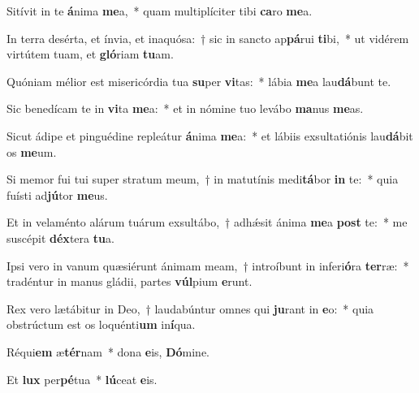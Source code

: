 \item Sitívit in te \textbf{á}nima \textbf{me}a,~* quam multiplíciter tibi \textbf{ca}ro \textbf{me}a.

\item In terra desérta, et ínvia, et inaquósa:~† sic in sancto ap\textbf{pá}rui \textbf{ti}bi,~* ut vidérem virtútem tuam, et \textbf{gló}riam \textbf{tu}am.

\item Quóniam mélior est misericórdia tua \textbf{su}per \textbf{vi}tas:~* lábia \textbf{me}a lau\textbf{dá}bunt te.

\item Sic benedícam te in \textbf{vi}ta \textbf{me}a:~* et in nómine tuo levábo \textbf{ma}nus \textbf{me}as.

\item Sicut ádipe et pinguédine repleátur \textbf{á}nima \textbf{me}a:~* et lábiis exsultatiónis lau\textbf{dá}bit os \textbf{me}um.

\item Si memor fui tui super stratum meum,~† in matutínis medi\textbf{tá}bor \textbf{in} te:~* quia fuísti ad\textbf{jú}tor \textbf{me}us.

\item Et in velaménto alárum tuárum exsultábo,~† adhǽsit ánima \textbf{me}a \textbf{post} te:~* me suscépit \textbf{déx}tera \textbf{tu}a.

\item Ipsi vero in vanum quæsiérunt ánimam meam,~† introíbunt in inferi\textbf{ó}ra \textbf{ter}ræ:~* tradéntur in manus gládii, partes \textbf{vúl}pium \textbf{e}runt.

\item Rex vero lætábitur in Deo,~† laudabúntur omnes qui \textbf{ju}rant in \textbf{e}o:~* quia obstrúctum est os loquénti\textbf{um} in\textbf{í}qua.

\item Réqui\textbf{em} æ\textbf{tér}nam~* dona \textbf{e}is, \textbf{Dó}mine.

\item Et \textbf{lux} per\textbf{pé}tua~* \textbf{lú}ceat \textbf{e}is.